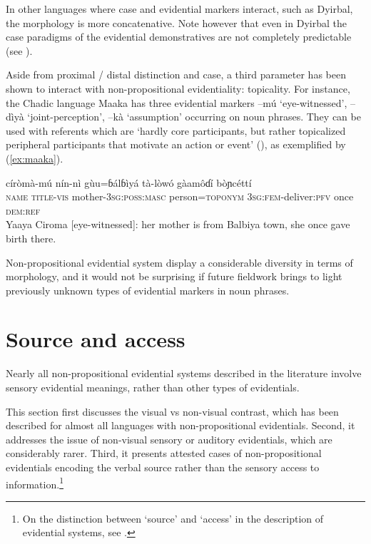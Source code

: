 \documentclass[oneside,a4paper,11pt]{article}
\newcommand{\ipa}[1]{{\phon \mbox{#1}}} %
\begin{document}
In other languages where case and evidential markers interact, such as Dyirbal, the morphology is more concatenative. Note however that even in Dyirbal the case paradigms of the evidential demonstratives are not completely predictable (see \citealt{dixon14nonvisible}).

Aside from proximal / distal distinction and case, a third parameter has been shown to interact with non-propositional evidentiality: topicality. For instance,  the Chadic language Maaka has three evidential markers \ipa{--mú} `eye-witnessed', \ipa{--dìyà} `joint-perception', \ipa{--kà} `assumption' occurring on noun phrases. They can be used with referents which are `hardly core participants, but rather topicalized peripheral participants that motivate an action or event' (\citealt[195-7]{storch14maaka}), as exemplified by (\ref{ex:maaka}).

\begin{exe}
\ex \label{ex:maaka}
\gll \ipa{yáayà} \ipa{círòmà-mú} \ipa{nín-nì} \ipa{gùu=ɓálɓìyá} \ipa{tà-lòwó} \ipa{gàamôɗí} \ipa{bòɲcéttí} \\
\textsc{name} \textsc{title-vis} mother-\textsc{3sg:poss:masc} person=\textsc{toponym} \textsc{3sg:fem}-deliver:\textsc{pfv} once \textsc{dem:ref} \\
\glt Yaaya Ciroma [eye-witnessed]: her mother is from Balbiya town, she once gave birth there.
\end{exe}

Non-propositional evidential system display a considerable diversity in terms of morphology, and it would not be surprising if future fieldwork brings to light previously unknown types of evidential markers in noun phrases.

\section{Source and access} \label{sec:type}
Nearly all non-propositional evidential systems described in the literature involve sensory evidential meanings, rather than other types of evidentials. 

This section first discusses the visual vs non-visual contrast, which has been described for almost all languages with non-propositional evidentials. Second, it addresses the issue of non-visual sensory or auditory evidentials, which are considerably rarer. Third, it presents attested cases of non-propositional evidentials encoding the verbal source rather than the sensory access to information.\footnote{On the distinction between `source' and `access' in the description of evidential systems, see \citet{tournadre14evidentiality}.}
\end{document}
